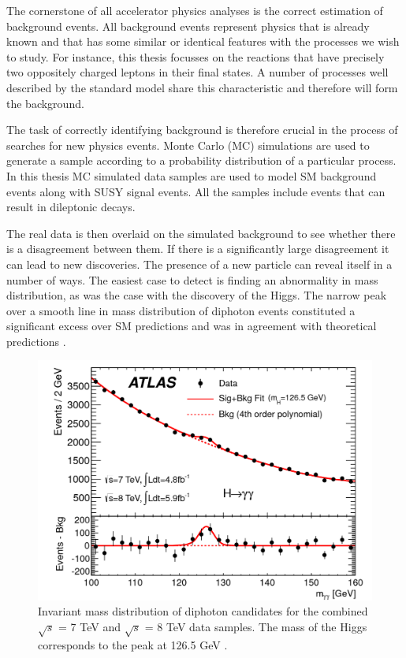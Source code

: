 The cornerstone of all accelerator physics analyses is the correct estimation of background events. All background events represent physics that is already known and that has some similar or identical features with the processes we wish to study. For instance, this thesis focusses on the  reactions that have precisely two oppositely charged leptons in their final states. A number of processes well described by the standard model share this characteristic and therefore will form the background. 

The task of correctly identifying background is therefore crucial in the process of searches for new physics events. Monte Carlo (MC) simulations are used to generate a sample according to a probability distribution of a particular process. In this thesis MC simulated data samples are used to model SM background events along with SUSY signal events. All the samples include events that can result in dileptonic decays. 

The real data is then overlaid on the simulated background to see whether there is a disagreement between them. If there is a significantly large disagreement it can lead to new discoveries. The presence of a new particle can reveal itself in a number of ways. The easiest case to detect is finding an abnormality in mass distribution, as was the case with the discovery of the Higgs. The narrow peak over a smooth line in mass distribution of diphoton events constituted a significant excess over SM predictions and was in agreement with theoretical predictions \citep{chatrchyan2012observation,Aad:2012tfa}. 

\begin{figure}
	\centering
	\captionsetup{width=0.8\textwidth}
	\includegraphics[scale=0.2]{Chap3/figaux_004a}
	\caption[width=0.8\textwidth]{Invariant mass distribution of diphoton 				candidates for the combined $\sqrt{s}$ = 7 TeV and $\sqrt{s}$ = 8 TeV 			data samples. The mass of the Higgs corresponds to the peak at 126.5 				GeV \citep{Aad:2012tfa}.}
\end{figure}

